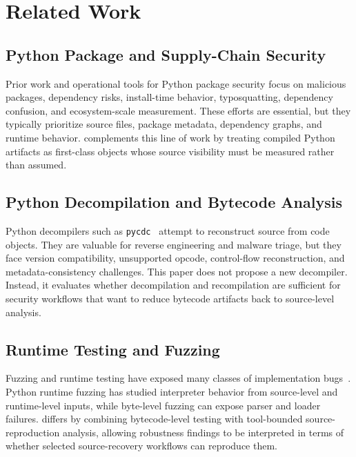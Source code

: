 \section{Related Work} \label{sec:related}

\subsection{Python Package and Supply-Chain Security}

Prior work and operational tools for Python package security focus on malicious packages, dependency risks, install-time behavior, typosquatting, dependency confusion, and ecosystem-scale measurement.  These efforts are essential, but they typically prioritize source files, package metadata, dependency graphs, and runtime behavior.  {\tech} complements this line of work by treating compiled Python artifacts as first-class objects whose source visibility must be measured rather than assumed.

\subsection{Python Decompilation and Bytecode Analysis}

Python decompilers such as \texttt{pycdc}~\cite{pycdc} attempt to reconstruct source from code objects.  They are valuable for reverse engineering and malware triage, but they face version compatibility, unsupported opcode, control-flow reconstruction, and metadata-consistency challenges.  This paper does not propose a new decompiler.  Instead, it evaluates whether decompilation and recompilation are sufficient for security workflows that want to reduce bytecode artifacts back to source-level analysis.

\subsection{Runtime Testing and Fuzzing}

Fuzzing and runtime testing have exposed many classes of implementation bugs~\cite{manes2018fuzzing,li2023pyrtfuzz}.  Python runtime fuzzing has studied interpreter behavior from source-level and runtime-level inputs, while byte-level fuzzing can expose parser and loader failures.  {\tech} differs by combining bytecode-level testing with tool-bounded source-reproduction analysis, allowing robustness findings to be interpreted in terms of whether selected source-recovery workflows can reproduce them.

